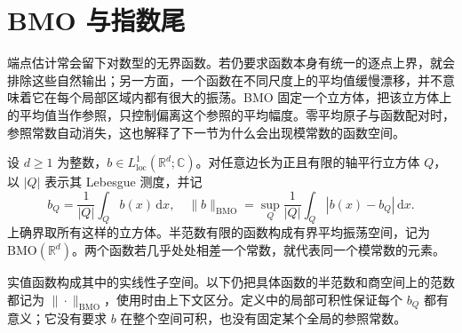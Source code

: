 \section{BMO 与指数尾}
\label{b2:sec:app-C-2}

端点估计常会留下对数型的无界函数。若仍要求函数本身有统一的逐点上界，就会排除这些自然输出；另一方面，一个函数在不同尺度上的平均值缓慢漂移，并不意味着它在每个局部区域内都有很大的振荡。BMO 固定一个立方体，把该立方体上的平均值当作参照，只控制偏离这个参照的平均幅度。零平均原子与函数配对时，参照常数自动消失，这也解释了下一节为什么会出现模常数的函数空间。

\begin{definition}\label{b2:def:C-bmo}
设 \(d\geq1\) 为整数，\(b\in L^1_{\mathrm{loc}}(\mathbb R^d;\mathbb C)\)。对任意边长为正且有限的轴平行立方体 \(Q\)，以 \(|Q|\) 表示其 Lebesgue 测度，并记
\[
 b_Q=\frac1{|Q|}\int_Qb(x)\,\mathrm dx,
 \quad
 \|b\|_{\mathrm{BMO}}
 =\sup_Q\frac1{|Q|}\int_Q|b(x)-b_Q|\,\mathrm dx.
\]
上确界取所有这样的立方体。半范数有限的函数构成有界平均振荡空间，记为 \(\mathrm{BMO}(\mathbb R^d)\)。两个函数若几乎处处相差一个常数，就代表同一个模常数的元素。
\end{definition}
实值函数构成其中的实线性子空间。以下仍把具体函数的半范数和商空间上的范数都记为 \(\|\cdot\|_{\mathrm{BMO}}\)，使用时由上下文区分。定义中的局部可积性保证每个 \(b_Q\) 都有意义；它没有要求 \(b\) 在整个空间可积，也没有固定某个全局的参照常数。

